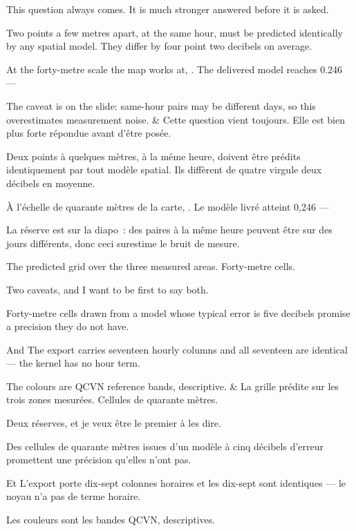 \documentclass[10pt,a4paper]{article}
\begin{document}
\begin{say}
This question always comes. It is much stronger answered before it is asked.

Two points a few metres apart, at the same hour, must be predicted identically by
any spatial model.  They differ by four point two decibels on average.

At the forty-metre scale the map works at, . The
delivered model reaches 0.246 --- 

The caveat is on the slide: same-hour pairs may be different days, so this
overestimates measurement noise.
&
Cette question vient toujours. Elle est bien plus forte répondue avant d'être
posée.

Deux points à quelques mètres, à la même heure, doivent être prédits
identiquement par tout modèle spatial.  Ils diffèrent de quatre
virgule deux décibels en moyenne.

À l'échelle de quarante mètres de la carte, .
Le modèle livré atteint 0,246 --- 

La réserve est sur la diapo~: des paires à la même heure peuvent être sur des
jours différents, donc ceci surestime le bruit de mesure.
\end{say}

\begin{say}
The predicted grid over the three measured areas. Forty-metre cells.

Two caveats, and I want to be first to say both.

 Forty-metre cells drawn from a model
whose typical error is five decibels promise a precision they do not have.

And  The export carries seventeen hourly columns and all
seventeen are identical --- the kernel has no hour term. 

The colours are QCVN reference bands, descriptive. 
&
La grille prédite sur les trois zones mesurées. Cellules de quarante mètres.

Deux réserves, et je veux être le premier à les dire.

 Des cellules de quarante
mètres issues d'un modèle à cinq décibels d'erreur promettent une précision
qu'elles n'ont pas.

Et  L'export porte dix-sept colonnes horaires et les
dix-sept sont identiques --- le noyau n'a pas de terme horaire. 

Les couleurs sont les bandes QCVN, descriptives. 
\end{say}
\end{document}
